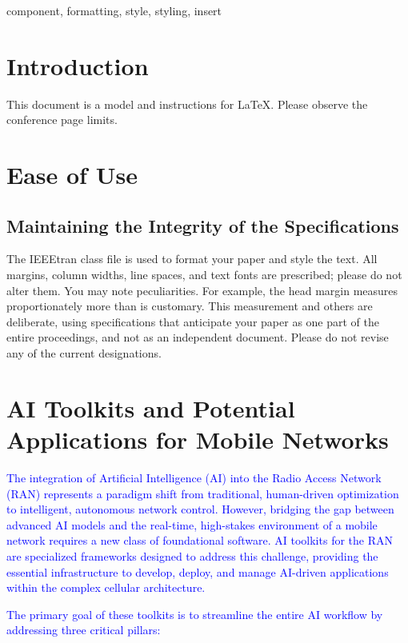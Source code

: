 \documentclass[conference]{IEEEtran}
\begin{document}
\begin{IEEEkeywords}
component, formatting, style, styling, insert
\end{IEEEkeywords}

\section{Introduction}
This document is a model and instructions for \LaTeX.
Please observe the conference page limits. 

\section{Ease of Use}

\subsection{Maintaining the Integrity of the Specifications}

The IEEEtran class file is used to format your paper and style the text. All margins, 
column widths, line spaces, and text fonts are prescribed; please do not 
alter them. You may note peculiarities. For example, the head margin
measures proportionately more than is customary. This measurement 
and others are deliberate, using specifications that anticipate your paper 
as one part of the entire proceedings, and not as an independent document. 
Please do not revise any of the current designations.

\section{AI Toolkits and Potential Applications for Mobile Networks}
\textcolor{blue}{The integration of Artificial Intelligence (AI) into the Radio Access Network (RAN) represents a paradigm shift from traditional, human-driven optimization to intelligent, autonomous network control. However, bridging the gap between advanced AI models and the real-time, high-stakes environment of a mobile network requires a new class of foundational software. AI toolkits for the RAN are specialized frameworks designed to address this challenge, providing the essential infrastructure to develop, deploy, and manage AI-driven applications within the complex cellular architecture.}

\textcolor{blue}{The primary goal of these toolkits is to streamline the entire AI workflow by addressing three critical pillars:}
\end{document}
